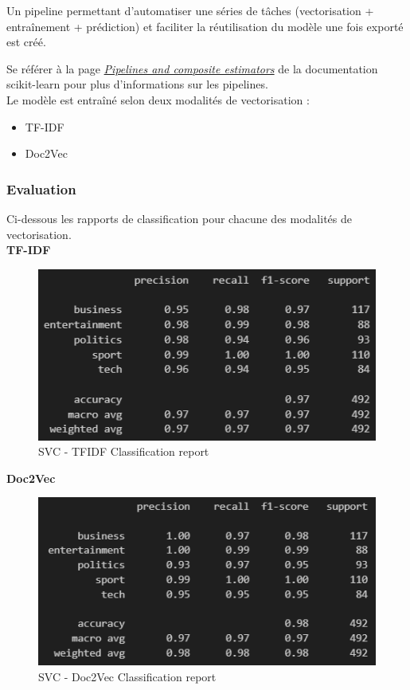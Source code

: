 \documentclass[a4paper,12pt]{article}
\begin{document}
Un pipeline permettant d'automatiser une séries de tâches (vectorisation + entraînement + prédiction) et faciliter la réutilisation du modèle une fois exporté est créé. 

Se référer à la page \href{https://scikit-learn.org/stable/modules/compose.html}{\textit{Pipelines and composite estimators}} de la documentation scikit-learn pour plus d'informations sur les pipelines.\\

Le modèle est entraîné selon deux modalités de vectorisation : 
\begin{itemize}
    \item TF-IDF
    \item Doc2Vec
\end{itemize}

\subsubsection{Evaluation}

Ci-dessous les rapports de classification pour chacune des modalités de vectorisation.\\

\textbf{TF-IDF}\\

\begin{figure}[H]
  \centering
  \includegraphics{images/svc_tfidf.png} 
  \caption{SVC - TFIDF Classification report}
  \label{fig:svctfidf}
\end{figure}

\textbf{Doc2Vec}\\

\begin{figure}[H]
  \centering
  \includegraphics{images/svc_doc2vec.png} 
  \caption{SVC - Doc2Vec Classification report}
  \label{fig:svcdoc2vec}
\end{figure}
\end{document}
